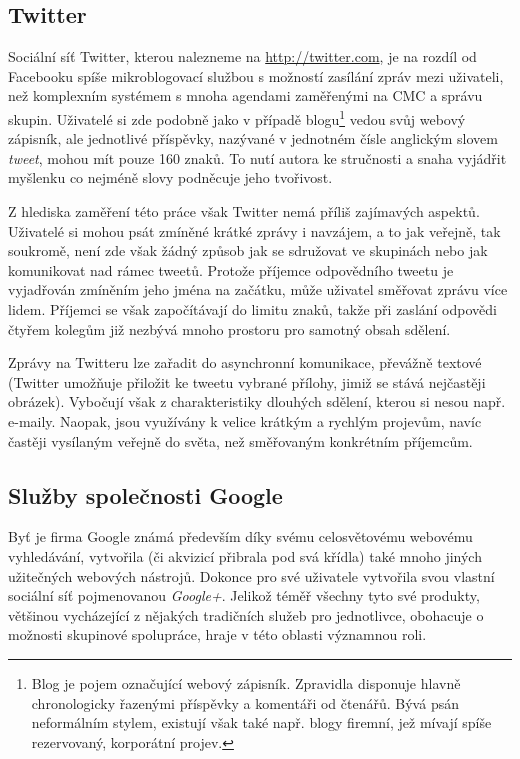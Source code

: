 \documentclass[12pt,oneside,final]{fithesis2}
\begin{document}
\subsection{Twitter}\label{twitter}
Sociální síť Twitter, kterou nalezneme na \url{http://twitter.com}, je na rozdíl od Facebooku spíše mikroblogovací službou s možností zasílání zpráv mezi uživateli, než komplexním systémem s mnoha agendami zaměřenými na CMC a správu skupin. Uživatelé si zde podobně jako v případě blogu\footnote{Blog je pojem označující webový zápisník. Zpravidla disponuje hlavně chronologicky řazenými příspěvky a komentáři od čtenářů. Bývá psán neformálním stylem, existují však také např. blogy firemní, jež mívají spíše rezervovaný, korporátní projev.} vedou svůj webový zápisník, ale jednotlivé příspěvky, nazývané v jednotném čísle anglickým slovem {\it tweet}, mohou mít pouze 160 znaků. To nutí autora ke stručnosti a snaha vyjádřit myšlenku co nejméně slovy podněcuje jeho tvořivost.

Z hlediska zaměření této práce však Twitter nemá příliš zajímavých aspektů. Uživatelé si mohou psát zmíněné krátké zprávy i navzájem, a to jak veřejně, tak soukromě, není zde však žádný způsob jak se sdružovat ve skupinách nebo jak komunikovat nad rámec tweetů. Protože příjemce odpovědního tweetu je vyjadřován zmíněním jeho jména na začátku, může uživatel směřovat zprávu více lidem. Příjemci se však započítávají do limitu znaků, takže při zaslání odpovědi čtyřem kolegům již nezbývá mnoho prostoru pro samotný obsah sdělení.

Zprávy na Twitteru lze zařadit do asynchronní komunikace, převážně textové (Twitter umožňuje přiložit ke tweetu vybrané přílohy, jimiž se stává nejčastěji obrázek). Vybočují však z charakteristiky dlouhých sdělení, kterou si nesou např. e-maily. Naopak, jsou využívány k velice krátkým a rychlým projevům, navíc častěji vysílaným veřejně do světa, než směřovaným konkrétním příjemcům.

\subsection{Služby společnosti Google}\label{google}
Byť je firma Google známá především díky svému celosvětovému webovému vyhledávání, vytvořila (či akvizicí přibrala pod svá křídla) také mnoho jiných užitečných webových nástrojů. Dokonce pro své uživatele vytvořila svou vlastní sociální síť pojmenovanou {\it Google+}. Jelikož téměř všechny tyto své produkty, většinou vycházející z nějakých tradičních služeb pro jednotlivce, obohacuje o možnosti skupinové spolupráce, hraje v této oblasti významnou roli.
\end{document}
